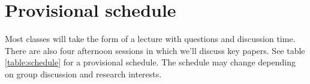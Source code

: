 \documentclass[12pt,\papersize]{extarticle}
\begin{document}
\section{Provisional schedule}

Most classes will take the form of a lecture with questions and discussion time. 
There are also four afternoon sessions in which we'll discuss key papers.
See table \vref{table:schedule} for a provisional schedule. 
The schedule may change depending on group discussion and research interests.

{
	\renewcommand{\arraystretch}{1.5}
\begin{table}[htbp]
\begin{center}
\footnotesize	%
\begin{tabular*}{1\textwidth}{ l l m{} } 

\toprule


\end{tabular*}
\end{center}
\end{table}}
\end{document}
